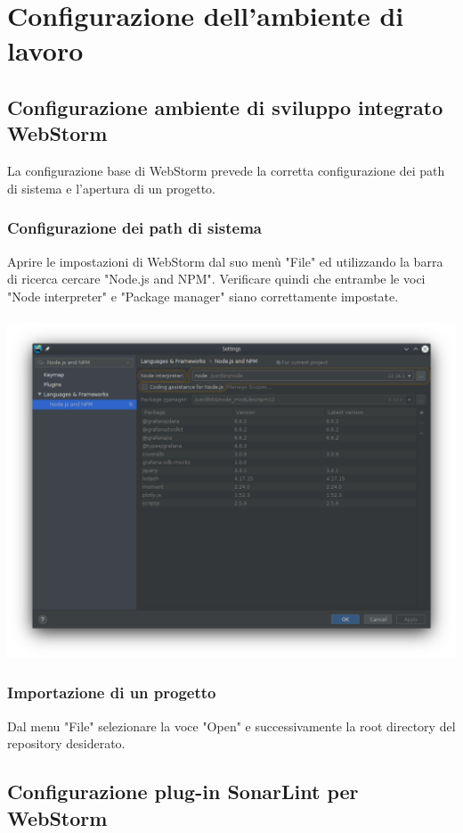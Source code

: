 \section{Configurazione dell'ambiente di lavoro}
\subsection{Configurazione ambiente di sviluppo integrato WebStorm}
La configurazione base di WebStorm prevede la corretta configurazione dei path di sistema e l'apertura di un progetto.
\subsubsection{Configurazione dei path di sistema}
Aprire le impostazioni di WebStorm dal suo menù "File" ed utilizzando la barra di ricerca cercare "Node.js and NPM". Verificare quindi che entrambe le voci "Node interpreter" e "Package manager" siano correttamente impostate.
\\
\\
\includegraphics[width=\textwidth,height=\textheight,keepaspectratio]{img/node-npm.png}
\subsubsection{Importazione di un progetto}
Dal menu "File" selezionare la voce "Open" e successivamente la root directory del repository desiderato.

\pagebreak
\subsection{Configurazione plug-in SonarLint per WebStorm}
